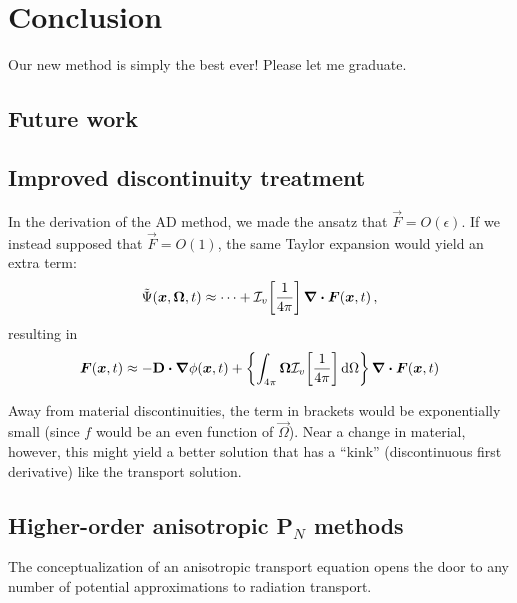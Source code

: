 
\chapter{Conclusion}

Our new method is simply the best ever! Please let me graduate.

\section{Future work}
\section{Improved discontinuity treatment}
In the derivation of the AD method, we made the ansatz that
$\vec{F}=O(\epsilon)$. If we instead supposed that $\vec{F}=O(1)$, the same
Taylor expansion would yield an extra term:
\begin{equation*}
  \tilde\Psi(\bm{x}, \bm{\Omega}, t)
  \approx \cdots + \mathcal{I}_{v}\!\left[ \frac1{4\pi} \right] \bm{\nabla} \bm{\cdot} \bm{F}(\bm{x},t)\,,
\end{equation*}
resulting in
\begin{equation*}
  \bm{F}(\bm{x}, t)
  \approx - \mathbf{D} \bm{\cdot} \bm{\nabla} \phi(\bm{x},t)
  + \left\{ \int_{4\pi} \bm{\Omega} \mathcal{I}_{v}\!\left[ \frac1{4\pi} \right] \mathop{}\!\mathrm{d}\Omega
  \right\} \bm{\nabla} \bm{\cdot} \bm{F}(\bm{x},t)
\end{equation*}

Away from material discontinuities, the term in brackets would be
exponentially small (since $f$ would be an even function of $\vec{\Omega}$).
Near a change in material, however, this might yield a better solution that has
a ``kink'' (discontinuous first derivative) like the transport solution.

\section{Higher-order anisotropic P$_N$ methods}
The conceptualization of an anisotropic transport equation opens the door to
any number of potential approximations to radiation transport.

